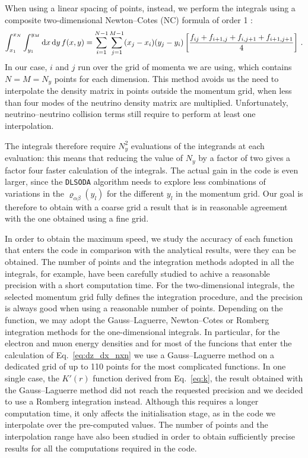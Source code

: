 \documentclass[notitlepage,nofootinbib,showpacs,preprintnumbers,amsmath,amssymb,superscriptaddress,prd,onecolumn]{revtex4-1}
\begin{document}
When using a linear spacing of points, instead,
we perform the integrals using a composite two-dimensional Newton--Cotes (NC) formula of order 1 \cite{newtoncotes}:
\begin{equation}
\int_{x_1}^{x_N}\int_{y_1}^{y_M}{\rm d}x\, {\rm d}y\, f(x, y)
=
\sum_{i=1}^{N-1}\sum_{j=1}^{M-1}
(x_j-x_i)(y_j-y_i)
\left[\frac{f_{ij} + f_{i+1,j} + f_{i,j+1} + f_{i+1,j+1}}{4}\right]\,.
\end{equation}
In our case, $i$ and $j$ run over the grid of momenta we are using,
which contains $N=M=N_y$ points for each dimension.
This method avoids us the need to interpolate the density matrix in points outside the momentum grid,
when less than four modes of the neutrino density matrix are multiplied.
Unfortunately, neutrino--neutrino collision terms still require to perform at least one interpolation.

The integrals therefore require $N_y^2$ evaluations of the integrands at each evaluation:
this means that reducing the value of $N_y$ by a factor of two
gives a factor four faster calculation of the integrals.
The actual gain in the code is even larger, since the \texttt{DLSODA} algorithm needs to explore less combinations
of variations in the $\varrho_{\alpha\beta}(y_l)$ for the different $y_l$ in the momentum grid.
Our goal is therefore to obtain with a coarse grid
a result that is in reasonable agreement with the one obtained using a fine grid.

In order to obtain the maximum speed,
we study the accuracy of each function that enters the code in comparison
with the analytical results, were they can be obtained.
The number of points and the integration methods adopted in all the integrals,
for example, have been carefully studied to achive a reasonable precision
with a short computation time.
For the two-dimensional integrals, the selected momentum grid
fully defines the integration procedure, and the precision is always good
when using a reasonable number of points.
Depending on the function, we may adopt the Gauss--Laguerre, Newton--Cotes or Romberg integration \cite{Romberg:1955}
methods for the one-dimensional integrals.
In particular, for the electron and muon energy densities
and for most of the funcions that enter the calculation of Eq.~\eqref{eq:dz_dx_nxn}
we use a Gauss--Laguerre method on a dedicated grid of up to 110 points
for the most complicated functions.
In one single case, the $K'(r)$ function derived from Eq.~\eqref{eq:k},
the result obtained with the Gauss--Laguerre method
did not reach the requested precision and we decided to use a Romberg integration instead.
Although this requires a longer computation time, it only affects the initialisation stage,
as in the code we interpolate over the pre-computed values.
The number of points and the interpolation range have also been studied in order to obtain sufficiently precise results
for all the computations required in the code.
\end{document}
